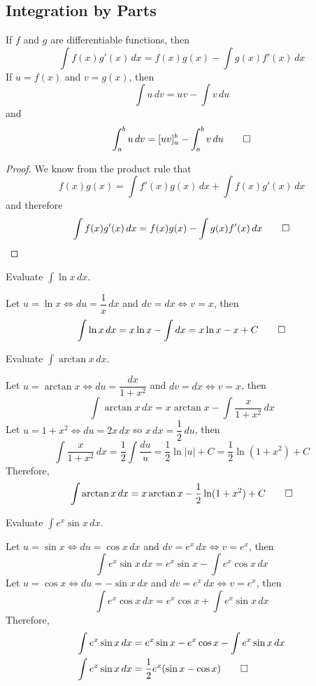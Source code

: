\subsection{Integration by Parts}
\begin{theorem}
    If \(f\) and \(g\) are differentiable functions, then
    \[\int f(x)g'(x)\,dx=f(x)g(x)-\int g(x)f'(x)\,dx\]
    If \(u=f(x)\) and \(v=g(x)\), then
    \[\int u\,dv=uv-\int v\,du\]
    and
    \[\int_a^b u\,dv=[uv]_a^b-\int_a^b v\,du\qedhere\]
\end{theorem}
\begin{proof}
    We know from the product rule that
    \[f(x)g(x)=\int f'(x)g(x)\,dx+\int f(x)g'(x)\,dx\]
    and therefore
    \[\int f(x)g'(x)\,dx=f(x)g(x)-\int g(x)f'(x)\,dx\qedhere\]
\end{proof}
\begin{problem}
    Evaluate \(\displaystyle{\int\ln x\,dx}\).
\end{problem}
\begin{solution}
    Let \(u=\ln x\iff du=\dfrac{1}{x}\,dx\) and \(dv=dx\iff v=x\),
    then
    \[\int\ln x\,dx=x\ln x-\int dx=x\ln x-x+C\qedhere\]
\end{solution}
\begin{problem}
    Evaluate \(\displaystyle{\int\arctan x\,dx}\).
\end{problem}
\begin{solution}
    Let \(u=\arctan x\iff du=\dfrac{dx}{1+x^2}\) and \(dv=dx\iff v=x\), then
    \[\int\arctan x\,dx=x\arctan x-\int\frac{x}{1+x^2}\,dx\]
    Let \(u=1+x^2\iff du=2x\,dx\) so \(x\,dx=\dfrac{1}{2}\,du\), then
    \[\int\frac{x}{1+x^2}\,dx=\frac{1}{2}\int\frac{du}{u}=\frac{1}{2}\ln|u|+C
    =\frac{1}{2}\ln(1+x^2)+C\]
    Therefore,
    \[\int\arctan x\,dx=x\arctan x-\frac{1}{2}\ln(1+x^2)+C\qedhere\]
\end{solution}
\begin{problem}
    Evaluate \(\displaystyle{\int e^x\sin x\,dx}\).
\end{problem}
\begin{solution}
    Let \(u=\sin x\iff du=\cos x\,dx\) and \(dv=e^x\,dx\iff v=e^x\),
    then
    \[\int e^x\sin x\,dx=e^x\sin x-\int e^x\cos x\,dx\]
    Let \(u=\cos x\iff du=-\sin x\,dx\) and \(dv=e^x\,dx\iff v=e^x\),
    then
    \[\int e^x\cos x\,dx=e^x\cos x+\int e^x\sin x\,dx\]
    Therefore,
    \begin{align*}
        \int e^x\sin x\,dx &= e^x\sin x-e^x\cos x-\int e^x\sin x\,dx \\
        \int e^x\sin x\,dx &= \frac{1}{2}e^x(\sin x-\cos x) \qedhere
    \end{align*}
\end{solution}
